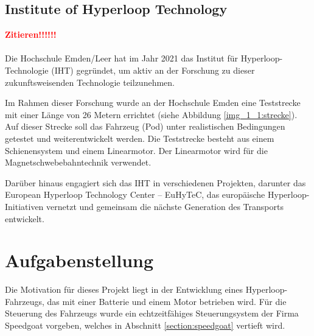 \subsection{Institute of Hyperloop Technology}
\label{section:IHT}

\textbf{\textcolor{red}{Zitieren!!!!!!}}\\ \ \\
Die Hochschule Emden/Leer hat im Jahr 2021 das Institut für Hyperloop-Technologie (IHT) gegründet, um aktiv an der Forschung zu dieser zukunftsweisenden Technologie teilzunehmen.

Im Rahmen dieser Forschung wurde an der Hochschule Emden eine Teststrecke mit einer Länge von 26 Metern errichtet (siehe Abbildung \ref{img_1_1:strecke}). Auf dieser Strecke soll das Fahrzeug (Pod) unter realistischen Bedingungen getestet und weiterentwickelt werden.
Die Teststrecke besteht aus einem Schienensystem und einem Linearmotor. Der Linearmotor wird für die Magnetschwebebahntechnik verwendet.


Darüber hinaus engagiert sich das IHT in verschiedenen Projekten, darunter das \frqq European Hyperloop Technology Center – EuHyTeC\flqq, das europäische Hyperloop-Initiativen vernetzt und gemeinsam die nächste Generation des Transports entwickelt.
\newpage




\section{Aufgabenstellung}
\label{section:Aufgabenstellung}



Die Motivation für dieses Projekt liegt in der Entwicklung eines Hyperloop-Fahrzeugs, das mit einer Batterie und einem Motor betrieben wird. Für die Steuerung des Fahrzeugs wurde ein echtzeitfähiges Steuerungsystem der Firma Speedgoat vorgeben, welches in Abschnitt \ref{section:speedgoat} vertieft wird.\\ \ \\


